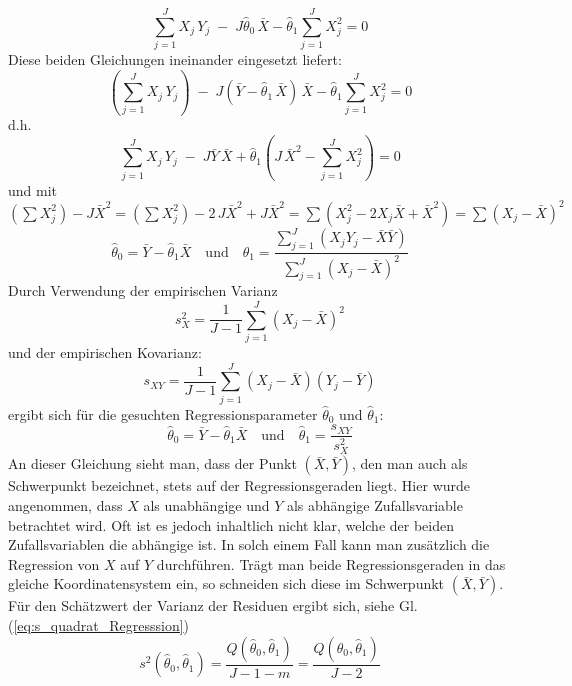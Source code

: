 \[
\sum\limits_{j = 1}^J {X_j \, Y_j \; - \; J \hat{\theta}_0 \, \bar {X}} - \hat{\theta}_1 \sum\limits_{j = 1}^J {X_j ^2 = 0}
\]
Diese beiden Gleichungen ineinander eingesetzt liefert:
\[
\left(\sum\limits_{j = 1}^J X_j \, Y_j\right) \; - 
\; J (\bar {Y} - \hat{\theta}_1 \, \bar {X}) \, \bar {X} - \hat{\theta}_1 \sum\limits_{j = 1}^J {X_j ^2 = 0}
\]
d.h.
\[
\sum\limits_{j = 1}^J X_j \, Y_j \; - \; J \bar {Y} \, \bar {X} + 
\hat{\theta}_1\left( J \, \bar {X}^2 - \sum\limits_{j = 1}^J X_j ^2 \right) = 0
\]
und mit $(\sum X_j^2) - J \bar X^2 = (\sum X_j^2) - 2 \, J \bar X^2  + J \bar X^2 = 
\sum(X_j^2 - 2 X_j \bar X  + \bar X^2) = \sum(X_j - \bar X)^2$
\[
\hat{\theta}_0 = \bar {Y} - \hat{\theta}_1 \bar {X} \quad \mathrm{und} \quad
\hat{\theta}_1 = \frac{\sum\limits_{j =
		1}^J {(X_j Y_j - \bar {X}\bar {Y})} }
{\sum\limits_{j = 1}^J {(X_j
		- \bar {X})^2} }
\]
Durch Verwendung der empirischen Varianz
\[
s_X^2 = \frac{1}{J - 1}\sum\limits_{j = 1}^J {(X_j - \bar {X})^2}
\]
\noindent und der empirischen Kovarianz:
\[
s_{XY} = \frac{1}{J - 1}\sum\limits_{j = 1}^J {(X_j - \bar
	{X})(Y_j - \bar {Y})}
\]
\noindent ergibt sich für die gesuchten Regressionsparameter
$\hat{\theta}_0$ und $\hat{\theta}_1 $:
\begin{equation}
\hat{\theta}_0 = \bar {Y} - \hat{\theta}_1 \bar {X} \quad \mathrm{und} \quad
\hat{\theta}_1 = \frac{s_{XY} }{s_X^2 }
\label{eq:Lineare_Regressionskonstanten}
\end{equation}
An dieser Gleichung sieht man, dass der Punkt $(\bar {X},\bar
{Y})$, den man auch als Schwerpunkt bezeichnet, stets auf der
Regressionsgeraden liegt. Hier wurde angenommen, dass $X$
als unabhängige und $Y $ als abhängige
Zufallsvariable betrachtet wird. Oft ist es jedoch inhaltlich
nicht klar, welche der beiden Zufallsvariablen die abh\"{a}ngige
ist. In solch einem Fall kann man zusätzlich die Regression
von $X$ auf $Y$ durchführen. Trägt man beide
Regressionsgeraden in das gleiche Koordinatensystem ein, so
schneiden sich diese im Schwerpunkt $(\bar {X},\bar {Y})$.
Für den Schätzwert der Varianz der Residuen ergibt sich, siehe Gl.(\ref{eq:s_quadrat_Regresssion})
\begin{equation}
s^2(\hat{\theta}_0 ,\hat{\theta}_1 ) = \frac{Q(\hat{\theta}_0 ,
	\hat{\theta}_1 )}{J - 1 - m } 
= \frac{Q(\hat{\theta}_0 ,
	\hat{\theta}_1 )}{J - 2}
\end{equation}

\newpage
